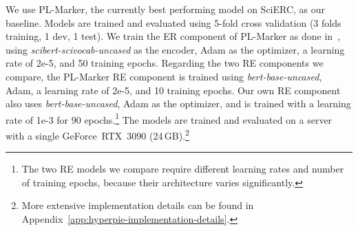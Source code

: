 We use PL-Marker, the currently best performing model on SciERC, as our baseline.
Models are trained and evaluated using 5-fold cross validation (3 folds training, 1 dev, 1 test).
%
%
We train the ER component of PL-Marker as done in~\cite{Ye2022}, using \textit{scibert-scivocab-uncased} as the encoder, Adam as the optimizer, a learning rate of 2e-5, and 50 training epochs. Regarding the two RE components we compare, the PL-Marker RE component is trained using \textit{bert-base-uncased}, Adam, a learning rate of 2e-5, and 10 training epochs. Our own RE component also uses \textit{bert-base-uncased}, Adam as the optimizer, and is trained with a learning rate of 1e-3 for 90 epochs.\footnote{The two RE models we compare require different learning rates and number of training epochs, because their architecture varies significantly.}
The models are trained and evaluated on a server with a single GeForce~RTX~3090 (24\,GB).\footnote{More extensive implementation details can be found in Appendix~\ref{app:hyperpie-implementation-details}.}



